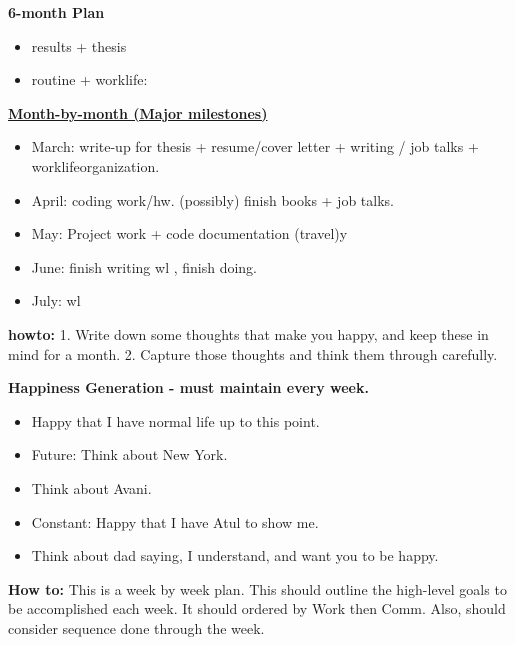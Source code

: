 \documentclass[11pt]{article}
\begin{document}
\textbf{6-month Plan} 
\begin{itemize} 
  \tiny \item \tiny results + thesis
\item \tiny routine + worklife:
\end{itemize}
\newpage
    {\small \underline{\textbf{Month-by-month (Major milestones)}}}\\
    \begin{itemize}
      \item \small March: write-up for thesis + resume/cover letter  +
         writing / job talks +    worklifeorganization. 
      \item \small April: coding work/hw. (possibly) finish books +
        job talks. 
      \item \small May: Project work + code documentation (travel)y
      \item \small June: finish writing wl , finish doing.
        \item \small July:  wl
    \end{itemize} 
\newpage 
\textbf{howto:} 1. Write down some thoughts that make you happy, and
keep these in mind for a month.  2. Capture those thoughts and think them through carefully. 

\textbf{Happiness Generation - must maintain every week.}
\begin{itemize}
  \tiny \item \tiny Happy that I have normal life up to this point.
  \item \tiny Future: Think about New York. 
  \item \tiny Think about Avani. 
  \item \tiny Constant: Happy that I have Atul to show me.
  \item \tiny Think about dad saying, I understand, and want you to be happy. 
\end{itemize} 

\newpage 
\textbf{How to:} This is a week by week plan. This should outline the
high-level goals to be accomplished each week. It should ordered by
Work then Comm. Also, should consider sequence done through the week.  \\
\end{document}
